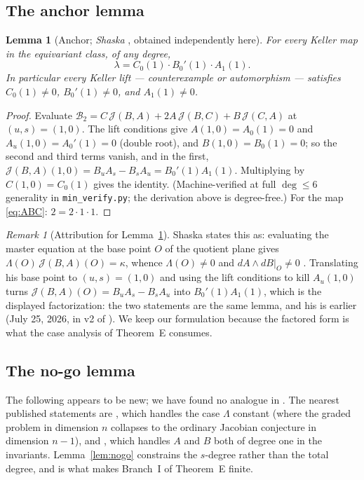 \documentclass[11pt]{amsart}
\newcommand{\Jb}{\mathcal{J}}
\newcommand{\brk}{\mathcal{B}}
\theoremstyle{plain}
\newtheorem{lemma}[theorem]{Lemma}
\theoremstyle{definition}
\theoremstyle{remark}
\newtheorem{remark}[theorem]{Remark}
\begin{document}
\subsection{The anchor lemma}

\begin{lemma}[Anchor; \emph{Shaska },
obtained independently here]\label{lem:anchor}
For every Keller map in the equivariant class, of any degree,
\[
\lambda=C_{0}(1)\cdot B_{0}'(1)\cdot A_{1}(1).
\]
In particular every Keller lift --- counterexample or automorphism ---
satisfies $C_{0}(1)\neq0$, $B_{0}'(1)\neq0$, and $A_{1}(1)\neq0$.
\end{lemma}

\begin{proof}
Evaluate $\brk_{2}=C\,\Jb(B,A)+2A\,\Jb(B,C)+B\,\Jb(C,A)$ at
$(u,s)=(1,0)$. The lift conditions give $A(1,0)=A_{0}(1)=0$ and
$A_{u}(1,0)=A_{0}'(1)=0$ (double root), and $B(1,0)=B_{0}(1)=0$; so the
second and third terms vanish, and in the first,
$\Jb(B,A)(1,0)=B_{u}A_{s}-B_{s}A_{u}=B_{0}'(1)A_{1}(1)$. Multiplying by
$C(1,0)=C_{0}(1)$ gives the identity. (Machine-verified at full
$\deg\le6$ generality in \texttt{min\_verify.py}; the derivation above is
degree-free.) For the map \eqref{eq:ABC}: $2=2\cdot1\cdot1$.
\end{proof}

\begin{remark}[Attribution for Lemma~\ref{lem:anchor}]
Shaska states this as: evaluating the master equation at the base point
$O$ of the quotient plane gives $\Lambda(O)\,\Jb(B,A)(O)=\kappa$, whence
$\Lambda(O)\neq0$ and $dA\wedge dB|_{O}\neq0$
\cite[Lem.~8.5]{Shaska26}. Translating his base point to $(u,s)=(1,0)$ and
using the lift conditions to kill $A_{u}(1,0)$ turns
$\Jb(B,A)(O)=B_{u}A_{s}-B_{s}A_{u}$ into $B_{0}'(1)A_{1}(1)$, which is the
displayed factorization: the two statements are the same lemma, and his is
earlier (July 25, 2026, in v2 of \cite{Shaska26}). We keep our formulation
because the factored form is what the case analysis of Theorem~E consumes.
\end{remark}

\subsection{The no-go lemma}

The following appears to be new; we have found no analogue in
\cite{Mayner26,Shaska26,Ulam26,Lou26,MO513387}. The nearest published
statements are \cite[Rem.~8.8]{Shaska26}, which handles the case
$\Lambda$ constant (where the graded problem in dimension $n$ collapses to
the ordinary Jacobian conjecture in dimension $n-1$), and
\cite[Thm.~10.10]{Shaska26}, which handles $A$ and $B$ both of degree one
in the invariants. Lemma~\ref{lem:nogo} constrains the $s$-degree rather
than the total degree, and is what makes Branch~I of Theorem~E finite.
\end{document}
